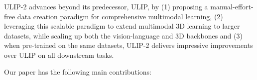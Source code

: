 \documentclass[10pt,twocolumn,letterpaper]{article}
\newcommand{\ning}[1]{\textcolor{blue}{Ning: #1}}
\newcommand{\JN}[1]{\textcolor{purple}{[junnan: #1]}}
\begin{document}


ULIP-2 advances beyond its predecessor, ULIP, by (1) proposing a manual-effort-free data creation paradigm for comprehensive multimodal learning, (2) leveraging this scalable paradigm to extend multimodal 3D learning to larger datasets, while scaling up both the vision-language and 3D backbones and (3) when pre-trained on the same datasets, ULIP-2 delivers impressive improvements over ULIP on all downstream tasks.

Our paper has the following main contributions:
\end{document}
